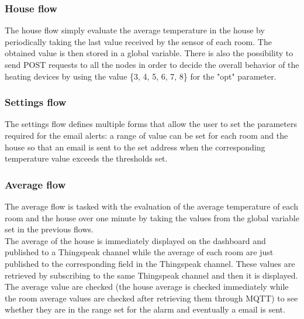 \subsubsection*{House flow}
The house flow simply evaluate the average temperature in the house by periodically taking the last value received by the sensor of each room. The obtained value is then stored in a global variable. There is also the possibility to send POST requests to all the nodes in order to decide the overall behavior of the heating devices by using the value \{3, 4, 5, 6, 7, 8\} for the "opt" parameter.

\subsubsection*{Settings flow}
The settings flow defines multiple forms that allow the user to set the parameters required for the email alerts: a range of value can be set for each room and the house so that an email is sent to the set address when the corresponding temperature value exceeds the thresholds set.

\subsubsection*{Average flow}
The average flow is tasked with the evaluation of the average temperature of each room and the house over one minute by taking the values from the global variable set in the previous flows.\\
The average of the house is immediately displayed on the dashboard and published to a Thingspeak channel while the average of each room are just published to the corresponding field in the Thingspeak channel. These values are retrieved by subscribing to the same Thingspeak channel and then it is displayed.\\
The average value are checked (the house average is checked immediately while the room average values are checked after retrieving them through MQTT) to see whether they are in the range set for the alarm and eventually a email is sent.

